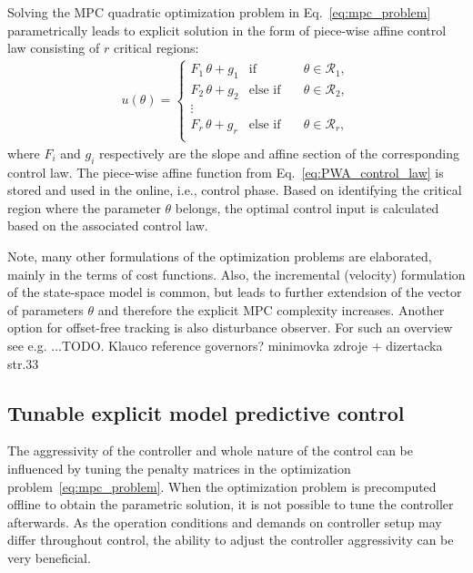 \documentclass[preprint,12pt]{elsarticle}
\begin{document}
Solving the MPC quadratic optimization problem in Eq.~\eqref{eq:mpc_problem} parametrically leads to explicit solution in the form of piece-wise affine control law consisting of $r$ critical regions:
\begin{eqnarray}
\label{eq:PWA_control_law}
u(\theta) = \left\{ 
\begin{matrix}
	F_{1} \, \theta + g_{1} & \mathrm{if} & \quad \theta \in \mathcal{R}_1, \\
	F_{2} \, \theta + g_{2} & \mathrm{else}\,\,\mathrm{if} &\quad \theta \in \mathcal{R}_2, \\
	\vdots & \\
	F_{r} \, \theta + g_{r} & \mathrm{else}\,\,\mathrm{if} & \quad \theta \in \mathcal{R}_{r}, \\
\end{matrix}
\right.
\end{eqnarray}
where $F_{i}$ and $g_{i}$ respectively are the slope and affine section of the corresponding control law. The piece-wise affine function from Eq.~\eqref{eq:PWA_control_law} is stored and used in the online, i.e., control phase. Based on identifying the critical region where the parameter $\theta$ belongs, the optimal control input is calculated based on the associated control law.

Note, many other formulations of the optimization problems are elaborated, mainly in the terms of cost functions. Also, the incremental (velocity) formulation of the state-space model is common, but leads to further extendsion of the vector of parameters $\theta$ and therefore the explicit MPC complexity increases. Another option for offset-free tracking is also disturbance observer. For such an overview see e.g. ...TODO. 
Klauco reference governors? minimovka zdroje + dizertacka str.33
      

\subsection{Tunable explicit model predictive control}
\label{sec:tunable}
The aggressivity of the controller and whole nature of the control can be influenced by tuning the penalty matrices in the optimization problem~\eqref{eq:mpc_problem}. When the optimization problem is precomputed offline to obtain the parametric solution, it is not possible to tune the controller afterwards. As the operation conditions and demands on controller setup may differ throughout control, the ability to adjust the controller aggressivity can be very beneficial.
\end{document}
